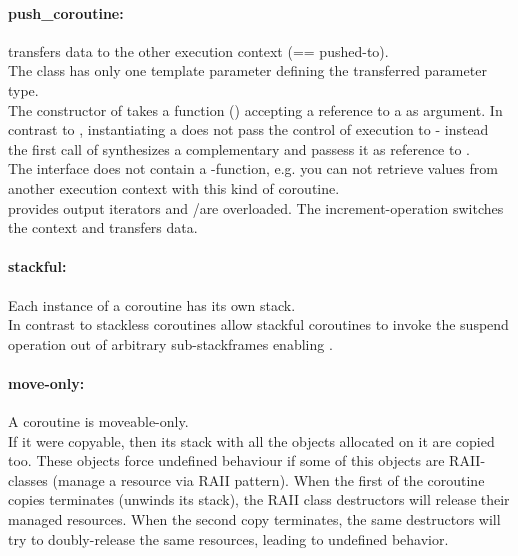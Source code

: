 \paragraph*{push\_coroutine:}
\pushcoro transfers data to the other execution context (== pushed-to).\\
The class has only one template parameter defining the transferred parameter
type.\\
The constructor of \pushcoro takes a function (\corofunction) accepting a
reference to a \pullcoro as argument. In contrast to \pullcoro, instantiating a
\pushcoro does not pass the control of execution to \corofunction{ }- instead
the first call of \pushcoroop synthesizes a complementary \pullcoro and passess
it as reference to \corofunction.\\
\newline
The interface does not contain a \get-function, e.g. you can not retrieve
values from another execution context with this kind of coroutine.\\
\newline
\pushcoro provides output iterators and \bgin/\ed are overloaded. The
increment-operation switches the context and transfers data.

\paragraph*{stackful:}
Each instance of a coroutine has its own stack.\\
\newline
In contrast to stackless coroutines allow stackful coroutines to invoke the
suspend operation out of arbitrary sub-stackframes enabling \escreops.

\paragraph*{move-only:}
A coroutine is moveable-only.\\
\newline
If it were copyable, then its stack with all the objects allocated on it
are copied too. These objects force undefined behaviour if some of this objects
are RAII-classes (manage a resource via RAII pattern). When the first of the
coroutine copies terminates (unwinds its stack), the RAII class destructors will
release their managed resources. When the second copy terminates, the same
destructors will try to doubly-release the same resources, leading to undefined
behavior.


